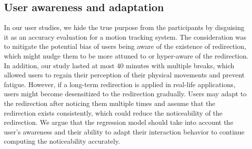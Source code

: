 

\subsection{User awareness and adaptation}

In our user studies, we hide the true purpose from the participants by disguising it as an accuracy evaluation for a motion tracking system.
The consideration was to mitigate the potential bias of users being aware of the existence of redirection, which might nudge them to be more attuned to or hyper-aware of the redirection.
In addition, our study lasted at most 40 minutes with multiple breaks, which allowed users to regain their perception of their physical movements and prevent fatigue.
However, if a long-term redirection is applied in real-life applications, users might become desensitized to the redirection gradually.
Users may adapt to the redirection after noticing them multiple times and assume that the redirection exists consistently, which could reduce the noticeability of the redirection.
We argue that the regression model should take into account the user's awareness and their ability to adapt their interaction behavior to continue computing the noticeability accurately.


